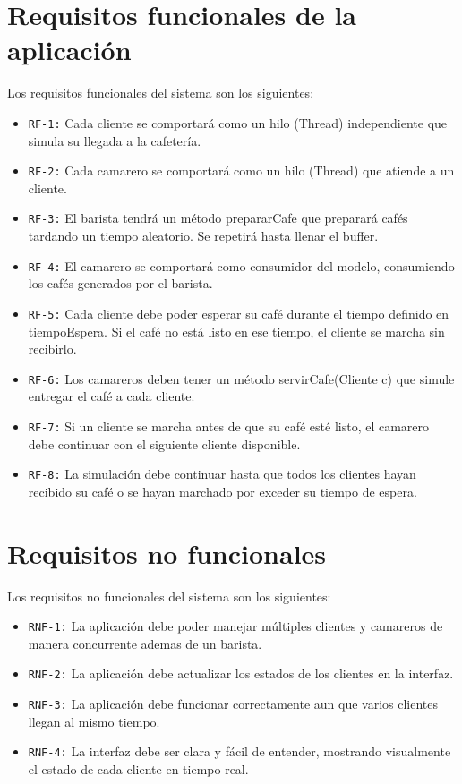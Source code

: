 \documentclass[a4paper,12pt]{article}
\begin{document}
    \section{Requisitos funcionales de la aplicación}
    Los requisitos funcionales del sistema son los siguientes:
    \begin{itemize}
        \item \texttt{RF-1:} Cada cliente se comportará como un hilo (Thread) independiente que simula su llegada a la cafetería.
        \item \texttt{RF-2:} Cada camarero se comportará como un hilo (Thread) que atiende a un cliente.
        \item \texttt{RF-3:} El barista tendrá un método prepararCafe que preparará cafés tardando un tiempo aleatorio. Se repetirá hasta llenar el buffer.
        \item \texttt{RF-4:} El camarero se comportará como consumidor del modelo, consumiendo los cafés generados por el barista.
        \item \texttt{RF-5:} Cada cliente debe poder esperar su café durante el tiempo definido en tiempoEspera. Si el café no está listo en ese tiempo, el cliente se marcha sin recibirlo.
        \item \texttt{RF-6:} Los camareros deben tener un método servirCafe(Cliente c) que simule entregar el café a cada cliente.
        \item \texttt{RF-7:} Si un cliente se marcha antes de que su café esté listo, el camarero debe continuar con el siguiente cliente disponible.
        \item \texttt{RF-8:} La simulación debe continuar hasta que todos los clientes hayan recibido su café o se hayan marchado por exceder su tiempo de espera.
    \end{itemize}
    \section{Requisitos no funcionales}
    Los requisitos no funcionales del sistema son los siguientes:
    \begin{itemize}
        \item \texttt{RNF-1:} La aplicación debe poder manejar múltiples clientes y camareros de manera concurrente ademas de un barista.
        \item \texttt{RNF-2:} La aplicación debe actualizar los estados de los clientes en la interfaz.
        \item \texttt{RNF-3:} La aplicación debe funcionar correctamente aun que varios clientes llegan al mismo tiempo.
        \item \texttt{RNF-4:} La interfaz debe ser clara y fácil de entender, mostrando visualmente el estado de cada cliente en tiempo real.
    \end{itemize}
\end{document}
